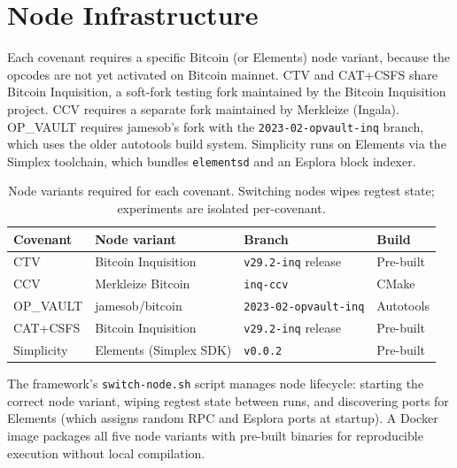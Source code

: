 \section{Node Infrastructure} \label{se:node_infrastructure}

Each covenant requires a specific Bitcoin (or Elements) node variant, because the
opcodes are not yet activated on Bitcoin mainnet. CTV and CAT+CSFS share Bitcoin
Inquisition, a soft-fork testing fork maintained by the Bitcoin Inquisition project.
CCV requires a separate fork maintained by Merkleize (Ingala). OP\_VAULT requires
jamesob's fork with the \texttt{2023-02-opvault-inq} branch, which uses the older
autotools build system. Simplicity runs on Elements via the Simplex toolchain, which
bundles \texttt{elementsd} and an Esplora block indexer.

\begin{table}[t]
\centering
\caption{Node variants required for each covenant. Switching nodes wipes regtest
state; experiments are isolated per-covenant.}
\label{tab:nodes}
\small
\begin{tabular}{@{}llll@{}}
\toprule
Covenant & Node variant & Branch & Build \\
\midrule
CTV       & Bitcoin Inquisition       & \texttt{v29.2-inq} release    & Pre-built \\
CCV       & Merkleize Bitcoin         & \texttt{inq-ccv}              & CMake \\
OP\_VAULT & jamesob/bitcoin           & \texttt{2023-02-opvault-inq}  & Autotools \\
CAT+CSFS  & Bitcoin Inquisition       & \texttt{v29.2-inq} release    & Pre-built \\
Simplicity & Elements (Simplex SDK)   & \texttt{v0.0.2}               & Pre-built \\
\bottomrule
\end{tabular}
\end{table}

The framework's \texttt{switch-node.sh} script manages node lifecycle: starting the
correct node variant, wiping regtest state between runs, and discovering ports for
Elements (which assigns random RPC and Esplora ports at startup). A Docker image
packages all five node variants with pre-built binaries for reproducible execution
without local compilation.
